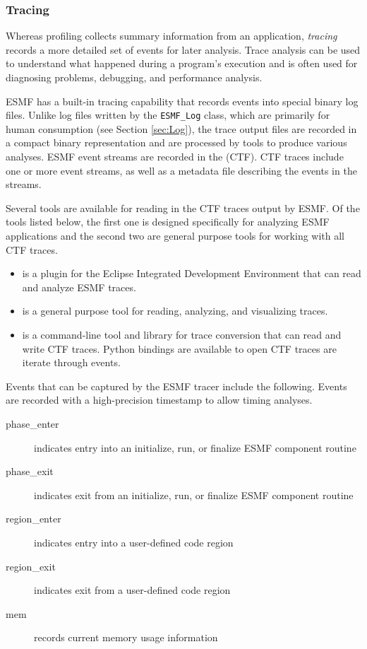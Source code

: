 \subsubsection{Tracing}
\label{sec:Tracing}

Whereas profiling collects summary information from an application,
{\em tracing} records a more detailed set of events for later analysis. Trace
analysis can be used to understand what happened during a program's
execution and is often used for diagnosing problems, debugging, and
performance analysis.

ESMF has a built-in tracing capability that records events into special
binary log files.  Unlike log files written by the {\tt ESMF\_Log} class,
which are primarily for human consumption (see Section \ref{sec:Log}),
the trace output files are
recorded in a compact binary representation and are processed by tools
to produce various analyses. ESMF event streams are recorded in the
 (CTF).
CTF traces include one or more event streams,
as well as a metadata file describing the events in the streams.

Several tools are available for reading in the CTF traces output by ESMF.
Of the tools listed below, the first one is designed specifically for
analyzing ESMF applications and the second two are general purpose tools
for working with all CTF traces.
\begin{itemize}
\item {}
  is a plugin for the Eclipse Integrated Development Environment
  that can read and analyze ESMF traces.
\item {}
  is a general purpose tool for reading, analyzing, and visualizing traces.
\item {}
  is a command-line tool and library for trace conversion
  that can read and write CTF traces. Python bindings are available
  to open CTF traces are iterate through events.  
\end{itemize}

Events that can be captured by the ESMF tracer include the following. Events
are recorded with a high-precision timestamp to allow timing analyses.
\begin{description}
\item [phase\_enter] indicates entry into an initialize, run, or finalize ESMF component routine
\item [phase\_exit] indicates exit from an initialize, run, or finalize ESMF component routine
\item [region\_enter] indicates entry into a user-defined code region
\item [region\_exit] indicates exit from a user-defined code region
\item [mem] records current memory usage information
\end{description}

